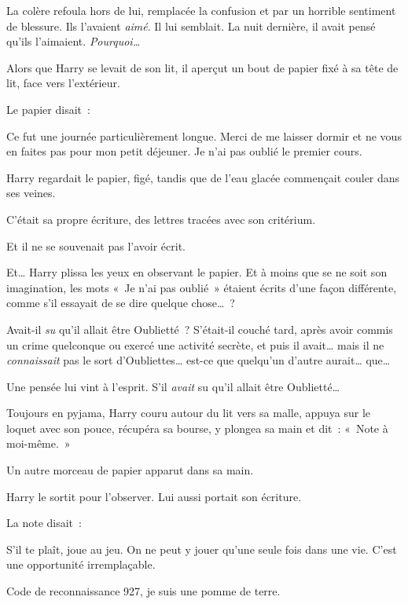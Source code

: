 La colère refoula hors de lui, remplacée la confusion et par un horrible sentiment de blessure.
Ils l'avaient \emph{aimé}. Il lui semblait.
La nuit dernière, il avait pensé qu'ils l'aimaient. \emph{Pourquoi…}

Alors que Harry se levait de son lit, il aperçut un bout de papier fixé à sa tête de lit, face vers l'extérieur.

Le papier disait~:
\begin{writtenNote}

Ce fut une journée particulièrement longue. Merci de me laisser dormir et ne vous en faites pas pour mon petit déjeuner. Je n'ai pas oublié le premier cours.

\end{writtenNote}
Harry regardait le papier, figé, tandis que de l'eau glacée commençait couler dans ses veines.

C'était sa propre écriture, des lettres tracées avec son critérium.

Et il ne se souvenait pas l'avoir écrit.

Et… Harry plissa les yeux en observant le papier.
Et à moins que se ne soit son imagination, les mots «~Je n'ai pas oublié~» étaient écrits d'une façon différente, comme s'il essayait de se dire quelque chose…~?

Avait-il \emph{su} qu'il allait être Oublietté~?
S'était-il couché tard, après avoir commis un crime quelconque ou exercé une activité secrète, et puis il avait… mais il ne \emph{connaissait} pas le sort d'Oubliettes… est-ce que quelqu'un d'autre aurait… que…

Une pensée lui vint à l'esprit.
S'il \emph{avait} su qu'il allait être Oublietté…

Toujours en pyjama, Harry couru autour du lit vers sa malle, appuya sur le loquet avec son pouce, récupéra sa bourse, y plongea sa main et dit~: «~Note à moi-même.~»

Un autre morceau de papier apparut dans sa main.

Harry le sortit pour l'observer. Lui aussi portait son écriture.

La note disait~:

\begin{writtenNote}

S'il te plaît, joue au jeu.
On ne peut y jouer qu'une seule fois dans une vie.
C'est une opportunité irremplaçable.

Code de reconnaissance 927, je suis une pomme de terre.

\end{writtenNote}

